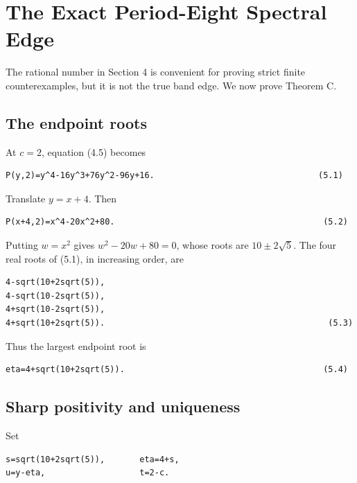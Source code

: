 \section{The Exact Period-Eight Spectral Edge}

The rational number in Section 4 is convenient for proving strict finite
counterexamples, but it is not the true band edge. We now prove Theorem C.

\subsection{The endpoint roots}

At \(c=2\), equation (4.5) becomes

\begin{lstlisting}[language={}]
P(y,2)=y^4-16y^3+76y^2-96y+16.                                 (5.1)
\end{lstlisting}

Translate \(y=x+4\). Then

\begin{lstlisting}[language={}]
P(x+4,2)=x^4-20x^2+80.                                          (5.2)
\end{lstlisting}

Putting \(w=x^2\) gives \(w^2-20w+80=0\), whose roots are
\(10\pm 2\sqrt{5}\). The four real roots of (5.1), in increasing order, are

\begin{lstlisting}[language={}]
4-sqrt(10+2sqrt(5)),
4-sqrt(10-2sqrt(5)),
4+sqrt(10-2sqrt(5)),
4+sqrt(10+2sqrt(5)).                                             (5.3)
\end{lstlisting}

Thus the largest endpoint root is

\begin{lstlisting}[language={}]
eta=4+sqrt(10+2sqrt(5)).                                        (5.4)
\end{lstlisting}

\subsection{Sharp positivity and uniqueness}

Set

\begin{lstlisting}[language={}]
s=sqrt(10+2sqrt(5)),       eta=4+s,
u=y-eta,                   t=2-c.
\end{lstlisting}

